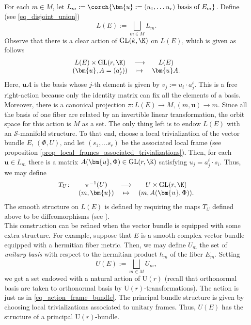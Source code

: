 For each \(m \in M\), let \(L_m:=\corch{\bm{u}:=(u_1, \ldots u_r) \text{ basis of } E_m}\). Define (see \eqref{eq_disjoint_union})
\begin{equation} \label{def_frame_bundle}
L(E):=\bigsqcup_{m \in M} L_m.
\end{equation}
Observe that there is a clear action of \(\mathrm{GL}(k, \K)\) on \(L(E)\), which is given as follows
\begin{equation} \label{eq_action_frame_bundle}
    \begin{array}{ccc}
        L(E) \times \mathrm{GL}(r, \K) & \longrightarrow & L(E) \\
        (\bm{u}, A=(a^i_j)) & \mapsto & \bm{u}A.
    \end{array}
\end{equation}
Here, \(\bm{u}A\) is the basis whose \(j\)-th element is given by \(v_j:=u_i\cdot a^i_j\). This is a free right-action because only the identity matrix can fix all the elements of a basis. Moreover, there is a canonical projection \(\pi\colon L(E)\to M, (m,\bm{u})\to m\). Since all the basis of one fiber are related by an invertible linear transformation, the orbit space for this action is \(M\) as a set. The only thing left is to endow \(L(E)\) with an \(\mathcal{S}\)-manifold structure. To that end, choose a local trivialization of the vector bundle \(E\), \((\Phi, U)\), and let \((s_1, \ldots s_r)\) be the associated local frame (see proposition \ref{prop_local_frames_associated_trivializations}). Then, for each \(\bm{u}\in L_m\) there is a matrix \(A(\bm{u}, \Phi)\in \mathrm{GL}(r, \K)\) satisfying \(u_j=a^i_j\cdot s_i\). Thus, we may define 
\[
\begin{array}{cccc}
    T_U \colon & \pi^{-1}(U) & \longrightarrow & U \times \mathrm{GL}(r, \K) \\
    & (m,\bm{u}) & \mapsto & (m, A(\bm{u}, \Phi)).
\end{array}
\]
The smooth structure on \(L(E)\) is defined by requiring the maps \(T_U\) defined above to be diffeomorphisms (see \parencite[Th. 4.3.3]{hamilton2018mathematical}). \\

This construction can be refined when the vector bundle is equipped with some extra structure. For example, suppose that \(E\) is a smooth complex vector bundle equipped with a hermitian fiber metric. Then, we may define \(U_m\) the set of \textit{unitary basis} with respect to the hermitian product \(h_m\) of the fiber \(E_m\). Setting
\begin{equation} \label{eq_def_UE}
U(E):=\bigsqcup_{m \in M} U_m,
\end{equation}
we get a set endowed with a natural action of \(\mathrm{U}(r)\) (recall that orthonormal basis are taken to orthonormal basis by \(\mathrm{U}(r)\)-transformations). The action is just as in \eqref{eq_action_frame_bundle}. The principal bundle structure is given by choosing local trivializations associated to unitary frames. Thus, \(U(E)\) has the structure of a principal \(\mathrm{U}(r)\)-bundle.

